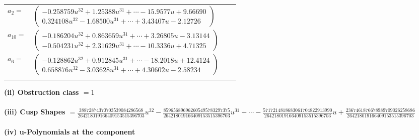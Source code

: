 \documentclass[1p]{elsarticle_modified}
\theoremstyle{definition}
\begin{document}
\begin{tabular}{m{7pt} m{180pt} m{7pt} m{180pt} }
\flushright $a_{2}=$&$\begin{pmatrix}-0.258759 u^{32}+1.25388 u^{31}+\cdots-15.9577 u+9.66690\\0.324108 u^{32}-1.68500 u^{31}+\cdots+3.43407 u-2.12726\end{pmatrix}$ \\
\flushright $a_{10}=$&$\begin{pmatrix}-0.186204 u^{32}+0.863659 u^{31}+\cdots+3.26805 u-3.13144\\-0.504231 u^{32}+2.31629 u^{31}+\cdots-10.3336 u+4.71325\end{pmatrix}$ \\
\flushright $a_{6}=$&$\begin{pmatrix}-0.128862 u^{32}+0.912845 u^{31}+\cdots-18.2018 u+12.4124\\0.658876 u^{32}-3.03628 u^{31}+\cdots+4.30602 u-2.58234\end{pmatrix}$\\&\end{tabular}
\flushleft \textbf{(ii) Obstruction class $= 1$}\\~\\
\flushleft \textbf{(iii) Cusp Shapes $= \frac{38872874370703539084286568}{264218019166409153515396703} u^{32}-\frac{859656896962605495783297375}{264218019166409153515396703} u^{31}+\cdots-\frac{5717214818683061704822913990}{264218019166409153515396703} u+\frac{2367461876678989709026258686}{264218019166409153515396703}$}\\~\\
\newpage\renewcommand{\arraystretch}{1}
\flushleft \textbf{(iv) u-Polynomials at the component}\newline \\
\end{document}
